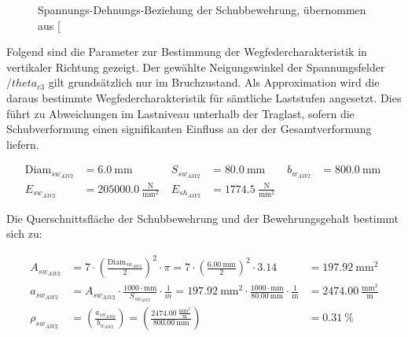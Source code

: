 \documentclass[
  10pt,
  letterpaper,
]{scrreprt}
\begin{document}
\begin{figure}[H]


\caption{\label{fig-sigma-eps-a3v2}Spannungs-Dehnungs-Beziehung der
Schubbewehrung, übernommen aus
{[}\citeproc{ref-gitz_ansatze_2024}{1}{]}}

\end{figure}%

Folgend sind die Parameter zur Bestimmung der Wegfedercharakteristik in
vertikaler Richtung gezeigt. Der gewählte Neigungswinkel der
Spannungsfelder \(/theta_{c3}\) gilt grundsätzlich nur im Bruchzustand.
Als Approximation wird die daraus bestimmte Wegfedercharakteristik für
sämtliche Laststufen angesetzt. Dies führt zu Abweichungen im Lastniveau
unterhalb der Traglast, sofern die Schubverformung einen signifikanten
Einfluss an der der Gesamtverformung liefern.

$$
\begin{aligned}
\mathrm{Diam}_{sw_{A3V2}} &= 6.0\ \mathrm{mm} \; 
 &S_{sw_{A3V2}} &= 80.0\ \mathrm{mm} \; 
 &b_{w_{A3V2}} &= 800.0\ \mathrm{mm} \; 
\\[12pt]
 E_{sw_{A3V2}} &= 205000.0\ \frac{\mathrm{N}}{\mathrm{mm}^{2}} \; 
 &E_{sh_{A3V2}} &= 1774.5\ \frac{\mathrm{N}}{\mathrm{mm}^{2}} \;
\end{aligned}
$$

Die Querschnittsfläche der Schubbewehrung und der Bewehrungsgehalt
bestimmt sich zu:

$$
\begin{aligned}
A_{sw_{A3V2}} &= 7 \cdot \left( \frac{ \mathrm{Diam}_{sw_{A3V2}} }{ 2 } \right) ^{ 2 } \cdot \pi  = 7 \cdot \left( \frac{ 6.00\ \mathrm{mm} }{ 2 } \right) ^{ 2 } \cdot 3.14 &= 197.92\ \mathrm{mm}^{2}  
\\[12pt]
a_{sw_{A3V2}} &= A_{sw_{A3V2}} \cdot \frac{ 1000 \cdot \mathrm{mm} }{ S_{sw_{A3V2}} } \cdot \frac{1} { m }  = 197.92\ \mathrm{mm}^{2} \cdot \frac{ 1000 \cdot \mathrm{mm} }{ 80.00\ \mathrm{mm} } \cdot \frac{1} { \mathrm{m} } &= 2474.00\ \frac{\mathrm{mm}^{2}}{\mathrm{m}}  
\\[12pt]
\rho_{sw_{A3V2}} &= \left( \frac{ a_{sw_{A3V2}} }{ b_{w_{A3V2}} } \right)  = \left( \frac{ 2474.00\ \frac{\mathrm{mm}^{2}}{\mathrm{m}} }{ 800.00\ \mathrm{mm} } \right) &= 0.31\ \mathrm{\%}  
\end{aligned}
$$
\end{document}

